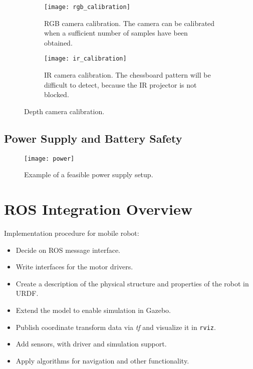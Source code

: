  \begin{figure}
 	\centering
 	\begin{subfigure}[b]{0.47\textwidth}
 		\texttt{[image: rgb\_calibration]}
 		\caption{RGB camera calibration. The camera can be calibrated when a sufficient number of samples have been obtained.}
 		\label{fig:rgb_calibration}
 	\end{subfigure}
 	\begin{subfigure}[b]{0.47\textwidth}
 		
 		\texttt{[image: ir\_calibration]}
 		\caption{IR camera calibration. The chessboard pattern will be difficult to detect, because the IR projector is not blocked.}
 		\label{fig:ir_calibration}
 	\end{subfigure}
 	\caption{Depth camera calibration.}
 \end{figure}

\subsection{Power Supply and Battery Safety}

\begin{figure}[h]
	\centering
	\texttt{[image: power]}
	\caption{Example of a feasible power supply setup.}
	\label{fig:power}
\end{figure}

\section{ROS Integration Overview}
\label{sec:integration}
Implementation procedure for mobile robot:

\begin{itemize}

	\item Decide on ROS message interface.
	\item Write interfaces for the motor drivers.
	\item Create a description of the physical structure and properties of the robot in \ac{URDF}. 
	\item Extend the model to enable simulation in Gazebo.
	\item Publish coordinate transform data via \textit{tf} and visualize it in \texttt{rviz}.
	\item Add sensors, with driver and simulation support.
	\item Apply algorithms for navigation and other functionality. 

\end{itemize}

